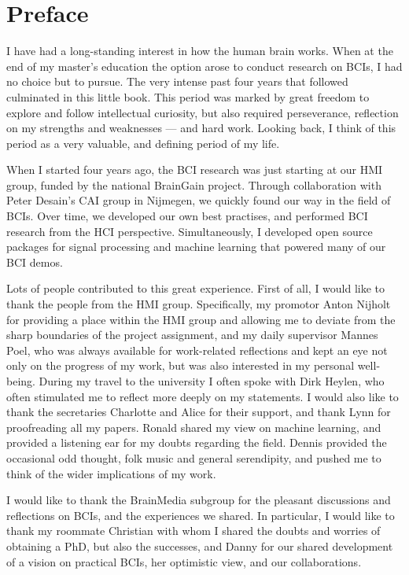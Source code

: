 \cleartoevenpage


\chapter{Preface}
\lettrine{I}{} have had a long-standing interest in how the human brain works.
When at the end of my master's education the option arose to conduct research on
\acp{BCI}, I had no choice but to pursue. The very intense past four years
that followed culminated in this little book. This period was marked by great
freedom to explore and follow intellectual curiosity, but also required
perseverance, reflection on my strengths and weaknesses --- and hard work.
Looking back, I think of this period as a very valuable, and defining period of
my life.

When I started four years ago, the \ac{BCI} research was just starting at our
\ac{HMI} group, funded by the national BrainGain project. Through collaboration
with Peter Desain's \ac{CAI} group in Nijmegen, we quickly found our way in the field of \acp{BCI}. Over time, we
developed our own best practises, and performed \ac{BCI} research from the
\ac{HCI} perspective. Simultaneously, I developed open source packages for
signal processing and machine learning that powered many of our \ac{BCI} demos.

Lots of people contributed to this great experience. First of all, I would like
to thank the people from the \ac{HMI} group. Specifically, my promotor Anton
Nijholt for providing a place within the \ac{HMI} group and allowing me to
deviate from the sharp boundaries of the project assignment, and my daily
supervisor Mannes Poel, who was always available for work-related reflections
and kept an eye not only on the progress of my work, but was also interested in
my personal well-being. During my travel to the university I often spoke with
Dirk Heylen, who often stimulated me to reflect more deeply on my statements. I
would also like to thank the secretaries Charlotte and Alice for their support,
and thank Lynn for proofreading all my papers.
%
Ronald shared my view on machine learning, and provided a listening ear for my
doubts regarding the field. Dennis provided the occasional odd thought, folk
music and general serendipity, and pushed me to think of the wider implications
of my work.

I would like to thank the BrainMedia subgroup for the pleasant discussions and
reflections on \acp{BCI}, and the experiences we shared. In particular, I would
like to thank my roommate Christian with whom I shared the doubts and worries
of obtaining a PhD, but also the successes, and Danny for our shared
development of a vision on practical \acp{BCI}, her optimistic view, and our collaborations.

